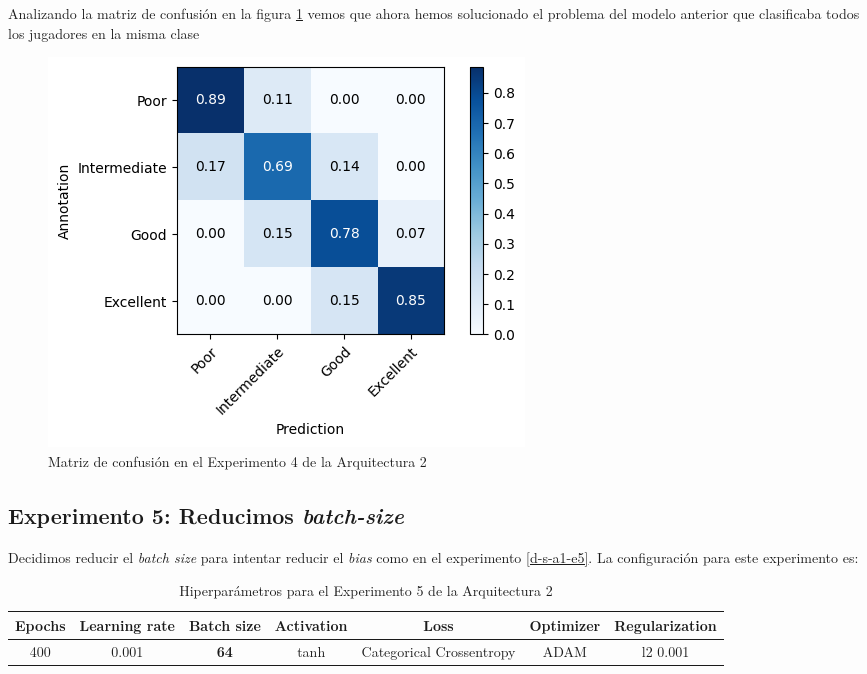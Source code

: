 \documentclass{article}
\begin{document}
			Analizando la matriz de confusi\'on en la figura \ref{d-cm-a2-e4} vemos que ahora hemos solucionado el problema del modelo anterior que clasificaba todos los jugadores en la misma clase
			\begin{figure}[!h]
				\begin{center}
					\includegraphics[scale=0.7]{d-cm-a2-e4.png}		
					\caption{Matriz de confusi\'on en el Experimento 4 de la Arquitectura 2}	
					\label{d-cm-a2-e4}
				\end{center}
			\end{figure}
		\newpage
		\subsection{Experimento 5: Reducimos \textit{batch-size}}
		\label{d-s-a2-e5}
			Decidimos reducir el \textit{batch size} para intentar reducir el \textit{bias} como en el experimento \ref{d-s-a1-e5}. La configuraci\'on para este experimento es:
			\begin{table}[!h]
				\begin{tabular}{| c | c | c | c | c | c | c |}
					\textbf{Epochs} & \textbf{Learning rate} & \textbf{Batch size} & \textbf{Activation} & \textbf{Loss} & \textbf{Optimizer} & \textbf{Regularization} \\ \hline
					400 & 0.001 & \textbf{64} & tanh & Categorical Crossentropy & ADAM & l2 0.001
				\end{tabular}
				\caption{Hiperpar\'ametros para el Experimento 5 de la Arquitectura 2}
				\label{tab:hip-d-a2-e5}
			\end{table}
			
\end{document}
